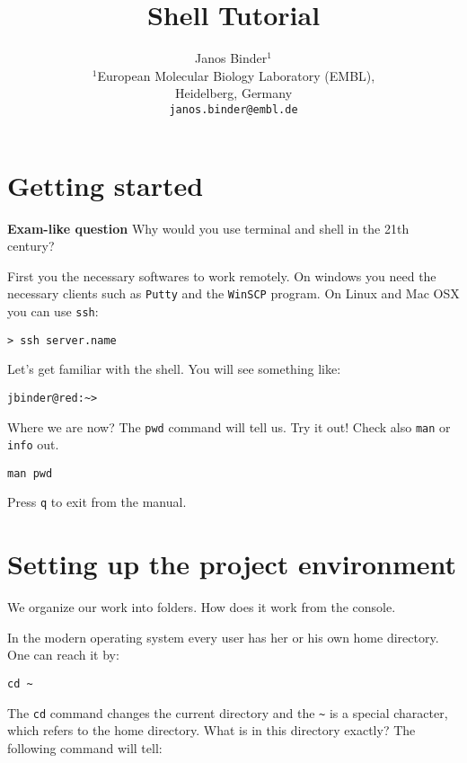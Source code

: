 \documentclass{article}\usepackage[]{graphicx}\usepackage[usenames,dvipsnames]{color}
\title{Shell Tutorial}
\author{Janos Binder$^1$ \\[1em]$^1$European Molecular Biology Laboratory (EMBL),\\ Heidelberg, Germany\\
\texttt{janos.binder@embl.de}}
\begin{document}
\maketitle


\tableofcontents

\section{Getting started} \label{sec:prep}

\textbf{Exam-like question} Why would you use terminal and shell in the 21th century?

First you the necessary softwares to work remotely. On windows you need the necessary clients such as \verb+Putty+ and the \verb+WinSCP+ program. On Linux and Mac OSX you can use \verb+ssh+:

\begin{verbatim}
> ssh server.name
\end{verbatim}

Let's get familiar with the shell. You will see something like:

\begin{verbatim}
jbinder@red:~> 
\end{verbatim}

Where we are now? The \verb+pwd+ command will tell us. Try it out! Check also \verb+man+ or \verb+info+ out.

\begin{verbatim}
man pwd
\end{verbatim}

Press \verb+q+ to exit from the manual.

\section{Setting up the project environment}

We organize our work into folders. How does it work from the console. 

In the modern operating system every user has her or his own home directory. One can reach it by:

\begin{verbatim}
cd ~
\end{verbatim}

The \verb+cd+ command changes the current directory and the \verb+~+ is a special character, which refers to the home directory. What is in this directory exactly? The following command will tell:
\end{document}

